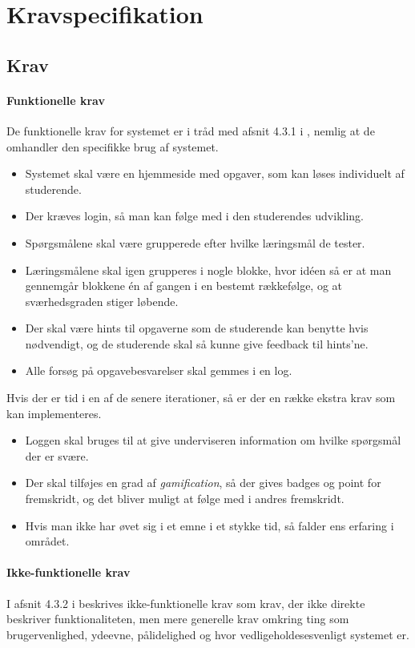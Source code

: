 \documentclass[12pt]{article}
\begin{document}
\section{Kravspecifikation}
\label{sec:kravspecifikation}

\subsection{Krav}
\label{sub:krav}
\paragraph{Funktionelle krav}
De funktionelle krav for systemet er i tråd med afsnit 4.3.1 i \cite{OOSE}, nemlig at de omhandler den specifikke brug af systemet.
\begin{itemize}
    \item Systemet skal være en hjemmeside med opgaver, som kan løses individuelt af studerende.
    \item Der kræves login, så man kan følge med i den studerendes udvikling.
    \item Spørgsmålene skal være grupperede efter hvilke læringsmål de tester.
    \item Læringsmålene skal igen grupperes i nogle blokke, hvor idéen så er at man gennemgår blokkene én af gangen i en bestemt rækkefølge, og at sværhedsgraden stiger løbende.
    \item Der skal være hints til opgaverne som de studerende kan benytte hvis nødvendigt, og de studerende skal så kunne give feedback til hints'ne.
    \item Alle forsøg på opgavebesvarelser skal gemmes i en log.
\end{itemize}
Hvis der er tid i en af de senere iterationer, så er der en række ekstra krav som kan implementeres.
\begin{itemize}
    \item Loggen skal bruges til at give underviseren information om hvilke spørgsmål der er svære.
    \item Der skal tilføjes en grad af \emph{gamification}, så der gives badges og point for fremskridt, og det bliver muligt at følge med i andres fremskridt.
    \item Hvis man ikke har øvet sig i et emne i et stykke tid, så falder ens erfaring i området.
\end{itemize}

\paragraph{Ikke-funktionelle krav}
\label{par:ikke_funktionelle_krav}
I afsnit 4.3.2 i \cite{OOSE} beskrives ikke-funktionelle krav som krav, der ikke direkte beskriver funktionaliteten, men mere generelle krav omkring ting som brugervenlighed, ydeevne, pålidelighed og hvor vedligeholdesesvenligt systemet er.
\end{document}
